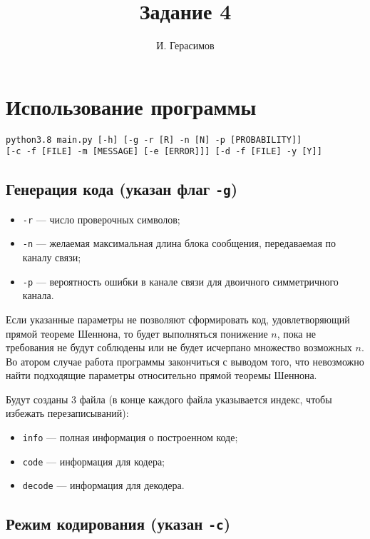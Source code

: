 \documentclass{article}
\title{Задание 4}
\author{И. Герасимов}
\date{}
\begin{document}
\maketitle

\section{Использование программы}

\begin{verbatim}
python3.8 main.py [-h] [-g -r [R] -n [N] -p [PROBABILITY]]
[-c -f [FILE] -m [MESSAGE] [-e [ERROR]]] [-d -f [FILE] -y [Y]] 
\end{verbatim}

\subsection{Генерация кода (указан флаг \texttt{-g})}\label{gen}

\begin{itemize}
\item \texttt{-r} --- число проверочных символов;
\item \texttt{-n} --- желаемая максимальная длина блока сообщения, передаваемая по каналу связи;
\item \texttt{-p} --- вероятность ошибки в канале связи для двоичного симметричного канала.
\end{itemize}

Если указанные параметры не позволяют сформировать код, удовлетворяющий прямой теореме Шеннона, то будет выполняться понижение $n$, пока не требования не будут соблюдены или не будет исчерпано множество возможных $n$.
Во атором случае работа программы закончиться с выводом того, что невозможно найти подходящие параметры относительно прямой теоремы Шеннона.

Будут созданы 3 файла (в конце каждого файла указывается индекс, чтобы избежать перезаписываний):

\begin{itemize}
\item \texttt{info} --- полная информация о построенном коде;
\item \texttt{code} --- информация для кодера;
\item \texttt{decode} --- информация для декодера.
\end{itemize}

\subsection{Режим кодирования (указан \texttt{-c})}
\end{document}
